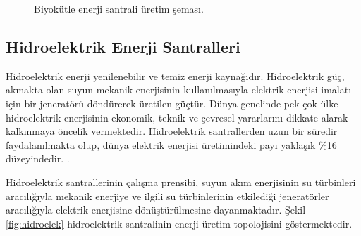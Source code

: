 \begin{figure}[htbp]


\caption{Biyokütle enerji santrali üretim şeması.}
\label{fig:biomass}
\end{figure}




\subsection{Hidroelektrik Enerji Santralleri}



Hidroelektrik enerji yenilenebilir ve temiz enerji kaynağıdır. Hidroelektrik güç,
akmakta olan suyun mekanik enerjisinin kullanılmasıyla elektrik enerjisi imalatı için bir jeneratörü döndürerek üretilen güçtür. Dünya genelinde pek çok ülke hidroelektrik enerjisinin ekonomik, teknik ve çevresel yararlarını dikkate alarak kalkınmaya öncelik vermektedir. Hidroelektrik santrallerden uzun bir süredir faydalanılmakta olup, dünya elektrik enerjisi üretimindeki payı yaklaşık \%16 düzeyindedir. \cite{speight2022encyclopedia}.


Hidroelektrik santrallerinin çalışma prensibi, suyun akım enerjisinin su türbinleri aracılığıyla mekanik enerjiye ve ilgili su türbinlerinin etkilediği jeneratörler aracılığıyla elektrik enerjisine dönüştürülmesine dayanmaktadır. Şekil \ref{fig:hidroelek} hidroelektrik santralinin enerji üretim topolojisini göstermektedir.
 
